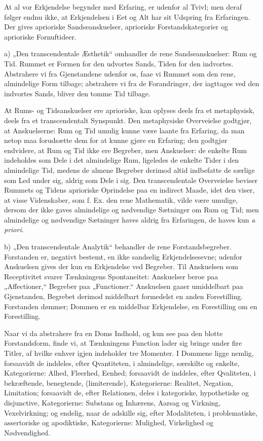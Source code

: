 \documentclass[12pt]{book}
\newcommand{\opage}[1]{\marginnote{\footnotesize\textit{[#1]}}}
\begin{document}
At al vor Erkjendelse begynder med Erfaring, er udenfor al Tvivl; men deraf følger
endnu ikke, at Erkjendelsen i Eet og Alt har sit Udspring fra Erfaringen. Der gives
aprioriske Sandseanskuelser, aprioriske Forstandskategorier og aprioriske
Fornuftideer.

a) „Den transcendentale Æsthetik“ omhandler de rene Sandseanskuelser: Rum og Tid.
Rummet er Formen for den udvortes Sands, Tiden for den indvortes. Abstrahere vi fra
Gjenstandene udenfor os, faae vi Rummet som den rene, almindelige Form tilbage;
abstrahere vi fra de Forandringer, der iagttages ved den indvortes Sands, bliver
den tomme Tid tilbage.

At Rums- og Tidsanskuelser ere aprioriske, kan oplyses deels fra et metaphysisk,
deels fra et transcendentalt Synspunkt. Den metaphysiske Overveielse godtgjør, at
Anskuelserne: Rum og Tid umulig kunne være laante fra Erfaring, da man netop maa
forudsætte dem for at kunne gjøre en Erfaring; den godtgjør endvidere, at Rum og
Tid ikke ere Begreber, men Anskuelser: de enkelte Rum indeholdes som Dele i det
almindelige Rum, ligeledes de enkelte Tider i den almindelige Tid, medens de almene
Begreber derimod altid indbefatte de særlige som Led under sig, aldrig som Dele i
sig. Den transcendentale Overveielse beviser Rummets og Tidens aprioriske
Oprindelse paa en indirect Maade, idet den viser, at visse Videnskaber, som f. Ex.
den rene Mathematik, vilde være umulige, dersom der ikke gaves almindelige og
nødvendige Sætninger om Rum og Tid; men almindelige og nødvendige Sætninger haves
aldrig fra Erfaringen, de haves kun \textit{a priori}.

b) „Den transcendentale Analytik“ behandler de rene Forstandsbegreber. Forstanden
er, negativt bestemt, en ikke sandselig Erkjendelsesevne; udenfor Anskuelsen gives
der kun en Erkjendelse ved Begreber. Til Anskuelsen som Receptivitet
\opage{25} svarer Tænkningens Spontaneitet: Anskuelser beroe paa „Affectioner,“ Begreber paa
„Functioner.“ Anskuelsen gaaer umiddelbart paa Gjenstanden, Begrebet derimod
middelbart formedelst en anden Forestilling. Forstanden dømmer; Dommen er en
middelbar Erkjendelse, en Forestilling om en Forestilling.

Naar vi da abstrahere fra en Doms Indhold, og kun see paa den blotte Forstandsform,
finde vi, at Tænkningens Function lader sig bringe under fire Titler, af hvilke
enhver igjen indeholder tre Momenter. I Dommene ligge nemlig, forsaavidt de
inddeles, efter Qvantiteten, i almindelige, særskilte og enkelte, Kategorierne:
Alhed, Fleerhed, Eenhed; forsaavidt de inddeles, efter Qvaliteten, i bekræftende,
benegtende, (limiterende), Kategorierne: Realitet, Negation, Limitation; forsaavidt
de, efter Relationen, deles i kategoriske, hypothetiske og disjunctive,
Kategorierne: Substans og Inhærens, Aarsag og Virkning, Vexelvirkning; og endelig,
naar de adskille sig, efter Modaliteten, i problematiske, assertoriske og
apodiktiske, Kategorierne: Mulighed, Virkelighed og Nødvendighed.
\end{document}
